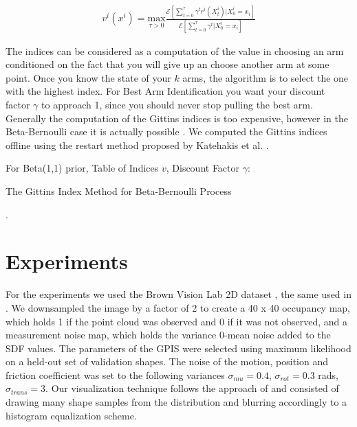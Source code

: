 \documentclass[journal,transmag]{IEEEtran}%
\begin{document}
\vspace{-2ex}
\label{eq:git_indices}
\begin{align}
	v^i(x^i) = \underset{\tau>0}{\mbox{max}} \frac{\mathcal{E}[\sum_{t=0}^{\tau}\gamma^tr^i(X_t^i)|X_0^i = x_i]}{\mathcal{E}[\sum_{t=0}^{\tau}\gamma^t|X_0^i = x_i]}
\end{align}


The indices can be considered as a computation of the value in choosing an arm conditioned on the fact that you will give up an choose another arm at some point. Once you know the state of your $k$ arms, the algorithm is to select the one with the highest index.  For Best Arm Identification you want your discount factor $\gamma$ to approach 1, since you should never stop pulling the best arm. Generally the computation of the Gittins indices is too expensive, however in the Beta-Bernoulli case it is actually possible \cite{kaufmann2012bayesian}. We computed the Gittins indices offline using the restart method proposed by Katehakis et al. \cite{katehakis1987multi}.


\begin{algorithm}
 For Beta(1,1) prior, Table of Indices $v$, Discount Factor $\gamma$: \\
 \caption{The Gittins Index Method for Beta-Bernoulli Process}
\end{algorithm}

 .
\section{Experiments}
For the experiments we used the Brown Vision Lab 2D dataset \cite{brown}, the same used in \cite{christopoulos2007handling}. We downsampled the image by a factor of 2 to create a 40 x 40 occupancy map, which holds 1 if the point cloud was observed and 0 if it was not observed, and a measurement noise map, which holds the variance 0-mean noise added to the SDF values. The parameters of the GPIS were selected using maximum likelihood on a held-out set of validation shapes. The noise of the motion, position and friction coefficient was set to the following variances $\sigma_{mu} = 0.4$, $\sigma_{rot} = 0.3$ rads,$\sigma_{trans} = 3$. Our visualization technique follows the approach of \cite{mahler2015gp} and consisted of drawing many shape samples from the distribution and blurring accordingly to a histogram equalization scheme. 
\end{document}
